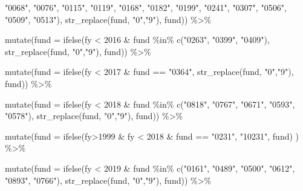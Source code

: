 \documentclass[
  letterpaper,
  DIV=11,
  numbers=noendperiod]{scrreport}
\newenvironment{Shaded}{\begin{snugshade}}{\end{snugshade}}
\newcommand{\AttributeTok}[1]{\textcolor[rgb]{0.40,0.45,0.13}{#1}}
\newcommand{\DecValTok}[1]{\textcolor[rgb]{0.68,0.00,0.00}{#1}}
\newcommand{\FunctionTok}[1]{\textcolor[rgb]{0.28,0.35,0.67}{#1}}
\newcommand{\NormalTok}[1]{\textcolor[rgb]{0.00,0.23,0.31}{#1}}
\newcommand{\SpecialCharTok}[1]{\textcolor[rgb]{0.37,0.37,0.37}{#1}}
\newcommand{\StringTok}[1]{\textcolor[rgb]{0.13,0.47,0.30}{#1}}
\begin{document}
\begin{Shaded}
\begin{Highlighting}[]
\StringTok{"0068"}\NormalTok{, }\StringTok{"0076"}\NormalTok{, }\StringTok{"0115"}\NormalTok{, }\StringTok{"0119"}\NormalTok{, }\StringTok{"0168"}\NormalTok{, }\StringTok{"0182"}\NormalTok{, }\StringTok{"0199"}\NormalTok{, }\StringTok{"0241"}\NormalTok{, }\StringTok{"0307"}\NormalTok{, }\StringTok{"0506"}\NormalTok{, }\StringTok{"0509"}\NormalTok{, }\StringTok{"0513"}\NormalTok{), }\FunctionTok{str\_replace}\NormalTok{(fund, }\StringTok{"0"}\NormalTok{,}\StringTok{"9"}\NormalTok{), fund)) }\SpecialCharTok{\%\textgreater{}\%}

  \FunctionTok{mutate}\NormalTok{(}\AttributeTok{fund =} \FunctionTok{ifelse}\NormalTok{(fy }\SpecialCharTok{\textless{}} \DecValTok{2016} \SpecialCharTok{\&}\NormalTok{ fund }\SpecialCharTok{\%in\%} \FunctionTok{c}\NormalTok{(}\StringTok{"0263"}\NormalTok{, }\StringTok{"0399"}\NormalTok{, }\StringTok{"0409"}\NormalTok{), }\FunctionTok{str\_replace}\NormalTok{(fund, }\StringTok{"0"}\NormalTok{,}\StringTok{"9"}\NormalTok{), fund)) }\SpecialCharTok{\%\textgreater{}\%}

  \FunctionTok{mutate}\NormalTok{(}\AttributeTok{fund =}  \FunctionTok{ifelse}\NormalTok{(fy }\SpecialCharTok{\textless{}} \DecValTok{2017} \SpecialCharTok{\&}\NormalTok{ fund }\SpecialCharTok{==} \StringTok{"0364"}\NormalTok{, }\FunctionTok{str\_replace}\NormalTok{(fund, }\StringTok{"0"}\NormalTok{,}\StringTok{"9"}\NormalTok{), fund)) }\SpecialCharTok{\%\textgreater{}\%}

  \FunctionTok{mutate}\NormalTok{(}\AttributeTok{fund =}  \FunctionTok{ifelse}\NormalTok{(fy }\SpecialCharTok{\textless{}} \DecValTok{2018} \SpecialCharTok{\&}\NormalTok{ fund }\SpecialCharTok{\%in\%} \FunctionTok{c}\NormalTok{(}\StringTok{"0818"}\NormalTok{, }\StringTok{"0767"}\NormalTok{, }\StringTok{"0671"}\NormalTok{, }\StringTok{"0593"}\NormalTok{, }\StringTok{"0578"}\NormalTok{), }\FunctionTok{str\_replace}\NormalTok{(fund, }\StringTok{"0"}\NormalTok{,}\StringTok{"9"}\NormalTok{), fund)) }\SpecialCharTok{\%\textgreater{}\%}


  \FunctionTok{mutate}\NormalTok{(}\AttributeTok{fund =} \FunctionTok{ifelse}\NormalTok{(fy}\SpecialCharTok{\textgreater{}}\DecValTok{1999} \SpecialCharTok{\&}\NormalTok{ fy }\SpecialCharTok{\textless{}} \DecValTok{2018} \SpecialCharTok{\&}\NormalTok{ fund }\SpecialCharTok{==} \StringTok{"0231"}\NormalTok{, }\StringTok{"10231"}\NormalTok{, fund) ) }\SpecialCharTok{\%\textgreater{}\%}
  

  \FunctionTok{mutate}\NormalTok{(}\AttributeTok{fund =} \FunctionTok{ifelse}\NormalTok{(fy }\SpecialCharTok{\textless{}} \DecValTok{2019} \SpecialCharTok{\&}\NormalTok{ fund }\SpecialCharTok{\%in\%} \FunctionTok{c}\NormalTok{(}\StringTok{"0161"}\NormalTok{, }\StringTok{"0489"}\NormalTok{, }\StringTok{"0500"}\NormalTok{, }\StringTok{"0612"}\NormalTok{, }\StringTok{"0893"}\NormalTok{, }\StringTok{"0766"}\NormalTok{), }\FunctionTok{str\_replace}\NormalTok{(fund, }\StringTok{"0"}\NormalTok{,}\StringTok{"9"}\NormalTok{), fund)) }\SpecialCharTok{\%\textgreater{}\%}


\end{Highlighting}
\end{Shaded}
\end{document}
